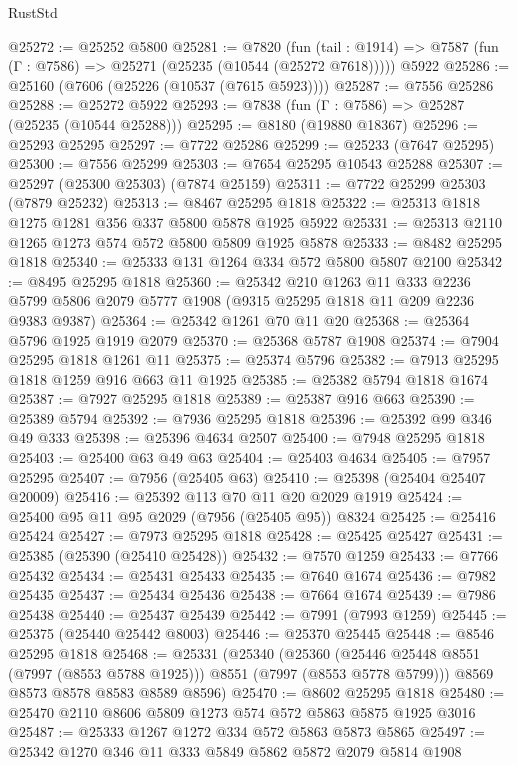 \begin{lexlean}{RustStd}
\begin{coremodule}
{\begin{coremodule}
{{{{{{{{{{{{{{{{{{{{{{{{{{{{{{{{{{{{{{{{{{{@25272 := @25252 @5800
@25281 := @7820
    (fun (tail : @1914) => @7587 (fun (Γ : @7586) => @25271 (@25235 (@10544 (@25272 @7618)))))
    @5922
@25286 := @25160 (@7606 (@25226 (@10537 (@7615 @5923))))
@25287 := @7556 @25286
@25288 := @25272 @5922
@25293 := @7838 (fun (Γ : @7586) => @25287 (@25235 (@10544 @25288)))
@25295 := @8180 (@19880 @18367)
@25296 := @25293 @25295
@25297 := @7722 @25286
@25299 := @25233 (@7647 @25295)
@25300 := @7556 @25299
@25303 := @7654 @25295 @10543 @25288
@25307 := @25297 (@25300 @25303) (@7874 @25159)
@25311 := @7722 @25299 @25303 (@7879 @25232)
@25313 := @8467 @25295 @1818
@25322 := @25313 @1818 @1275 @1281 @356 @337 @5800 @5878 @1925 @5922
@25331 := @25313 @2110 @1265 @1273 @574 @572 @5800 @5809 @1925 @5878
@25333 := @8482 @25295 @1818
@25340 := @25333 @131 @1264 @334 @572 @5800 @5807 @2100
@25342 := @8495 @25295 @1818
@25360 := @25342
    @210
    @1263
    @11
    @333
    @2236
    @5799
    @5806
    @2079
    @5777
    @1908
    (@9315 @25295 @1818 @11 @209 @2236 @9383 @9387)
@25364 := @25342 @1261 @70 @11 @20
@25368 := @25364 @5796 @1925 @1919 @2079
@25370 := @25368 @5787 @1908
@25374 := @7904 @25295 @1818 @1261 @11
@25375 := @25374 @5796
@25382 := @7913 @25295 @1818 @1259 @916 @663 @11 @1925
@25385 := @25382 @5794 @1818 @1674
@25387 := @7927 @25295 @1818
@25389 := @25387 @916 @663
@25390 := @25389 @5794
@25392 := @7936 @25295 @1818
@25396 := @25392 @99 @346 @49 @333
@25398 := @25396 @4634 @2507
@25400 := @7948 @25295 @1818
@25403 := @25400 @63 @49 @63
@25404 := @25403 @4634
@25405 := @7957 @25295
@25407 := @7956 (@25405 @63)
@25410 := @25398 (@25404 @25407 @20009)
@25416 := @25392 @113 @70 @11 @20 @2029 @1919
@25424 := @25400 @95 @11 @95 @2029 (@7956 (@25405 @95)) @8324
@25425 := @25416 @25424
@25427 := @7973 @25295 @1818
@25428 := @25425 @25427
@25431 := @25385 (@25390 (@25410 @25428))
@25432 := @7570 @1259
@25433 := @7766 @25432
@25434 := @25431 @25433
@25435 := @7640 @1674
@25436 := @7982 @25435
@25437 := @25434 @25436
@25438 := @7664 @1674
@25439 := @7986 @25438
@25440 := @25437 @25439
@25442 := @7991 (@7993 @1259)
@25445 := @25375 (@25440 @25442 @8003)
@25446 := @25370 @25445
@25448 := @8546 @25295 @1818
@25468 := @25331
    (@25340
      (@25360 (@25446 @25448 @8551 (@7997 (@8553 @5788 @1925))) @8551 (@7997 (@8553 @5778 @5799)))
      @8569
      @8573
      @8578
      @8583
      @8589
      @8596)
@25470 := @8602 @25295 @1818
@25480 := @25470 @2110 @8606 @5809 @1273 @574 @572 @5863 @5875 @1925 @3016
@25487 := @25333 @1267 @1272 @334 @572 @5863 @5873 @5865
@25497 := @25342 @1270 @346 @11 @333 @5849 @5862 @5872 @2079 @5814 @1908
}}}}}}}}}}}}}}}}}}}}}}}}}}}}}}}}}}}}}}}}}}}
\end{coremodule}}
\end{coremodule}
\end{lexlean}
